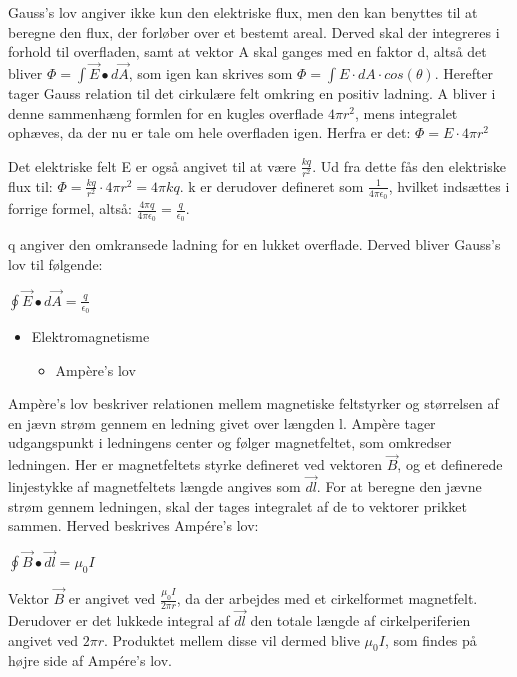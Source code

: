 Gauss's lov angiver ikke kun den elektriske flux, men den kan benyttes til at beregne den flux, der forløber over et bestemt areal. Derved skal der integreres i forhold til overfladen, samt at vektor A skal ganges med en faktor d, altså det bliver $\Phi = \int \vec{E} \bullet d \vec{A}$, som igen kan skrives som $\Phi = \int E \cdot dA \cdot cos(\theta)$. Herefter tager Gauss relation til det cirkulære felt omkring en positiv ladning. A bliver i denne sammenhæng formlen for en kugles overflade $4 \pi r^2$, mens integralet ophæves, da der nu er tale om hele overfladen igen. Herfra er det: $\Phi = E \cdot 4 \pi r^2$

Det elektriske felt E er også angivet til at være $\frac{kq}{r^2}$. Ud fra dette fås den elektriske flux til: $\Phi = \frac{kq}{r^2} \cdot 4 \pi r^2 = 4 \pi k q$. k er derudover defineret som $\frac{1}{4 \pi \epsilon_0}$, hvilket indsættes i forrige formel, altså: $\frac{4 \pi q}{4 \pi \epsilon_0} = \frac{q}{\epsilon_0}$.

q angiver den omkransede ladning for en lukket overflade. Derved bliver Gauss's lov til følgende:

\centerline{$\oint \vec{E} \bullet d \vec{A} = \frac{q}{\epsilon_0}$}

\begin{itemize}
\item Elektromagnetisme
\begin{itemize}
\item Ampère's lov
\end{itemize}
\end{itemize}
Ampère's lov beskriver relationen mellem magnetiske feltstyrker og størrelsen af en jævn strøm gennem en ledning givet over længden l. Ampère tager udgangspunkt i ledningens center og følger magnetfeltet, som omkredser ledningen. Her er magnetfeltets styrke defineret ved vektoren $\vec{B}$, og et definerede linjestykke af magnetfeltets længde angives som $\vec{dl}$. For at beregne den jævne strøm gennem ledningen, skal der tages integralet af de to vektorer prikket sammen. Herved beskrives Ampére's lov:

\centerline{$\oint \vec{B} \bullet \vec{dl} = \mu_0 I$}

Vektor $\vec{B}$ er angivet ved $\frac{\mu_0 I}{2 \pi r}$, da der arbejdes med et cirkelformet magnetfelt. Derudover er det lukkede integral af $\vec{dl}$ den totale længde af cirkelperiferien angivet ved $2 \pi r$. Produktet mellem disse vil dermed blive $\mu_0 I$, som findes på højre side af Ampére's lov.



